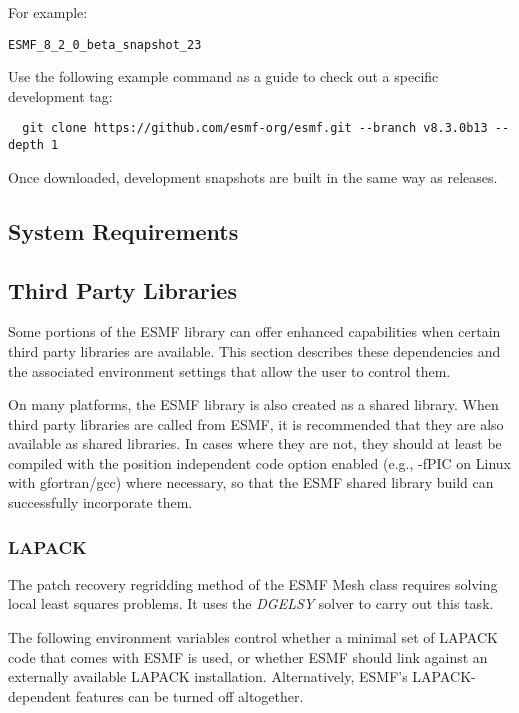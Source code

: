For example:
\begin{verbatim}
ESMF_8_2_0_beta_snapshot_23
\end{verbatim}

Use the following example command as a guide to check out a specific development tag:

\begin{verbatim}
  git clone https://github.com/esmf-org/esmf.git --branch v8.3.0b13 --depth 1
\end{verbatim}

Once downloaded, development snapshots are built in the same way as releases.

\subsection{System Requirements}
\label{sec:systemreq}


\subsection{Third Party Libraries}
\label{sec:ThirdParty}

Some portions of the ESMF library can offer enhanced capabilities when
certain third party libraries are available. This section describes
these dependencies and the associated environment settings
that allow the user to control them.

On many platforms, the ESMF library is also created as a shared library.
When third party libraries are called from ESMF, it is recommended that they are
also available as shared libraries.  In cases where they are not, they should at
least be compiled with the position independent code option enabled (e.g., -fPIC on
Linux with gfortran/gcc) where necessary, so that the ESMF shared library
build can successfully incorporate them.

\subsubsection{LAPACK}
\label{sec:lapack}
The patch recovery regridding method of the ESMF Mesh class requires solving
local least squares problems. It uses the
 {\it DGELSY} solver
to carry out this task.

The following environment variables control whether a minimal set of
LAPACK code that comes with ESMF is used, or whether ESMF should link against
an externally available LAPACK installation. Alternatively, ESMF's
LAPACK-dependent features can be turned off altogether.

